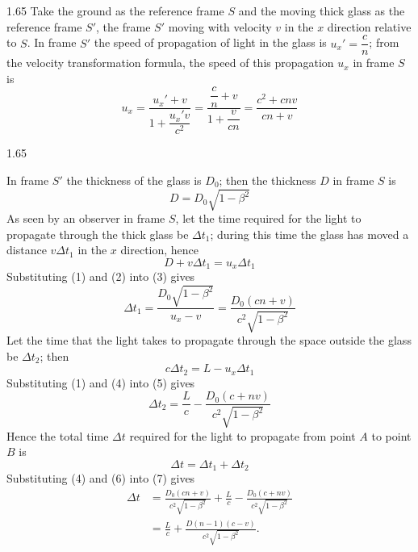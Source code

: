 \begin{solution}{1.65}
Take the ground as the reference frame $S$ and the moving thick glass as the reference frame $S'$, the frame $S'$ moving with velocity $v$ in the $x$ direction relative to $S$. In frame $S'$ the speed of propagation of light in the glass is $u_x'=\dfrac{c}{n}$; from the velocity transformation formula, the speed of this propagation $u_x$ in frame $S$ is
\begin{equation}
u_x=\frac{u_x'+v}{1+\dfrac{u_x'v}{c^2}}=\frac{\dfrac{c}{n}+v}{1+\dfrac{v}{cn}}=\frac{c^2+cnv}{cn+v} \tag{1}
\end{equation}

\begin{figbox}{1.65}
\end{figbox}

In frame $S'$ the thickness of the glass is $D_0$; then the thickness $D$ in frame $S$ is
\begin{equation}
D=D_0\sqrt{1-\beta^2} \tag{2}
\end{equation}
As seen by an observer in frame $S$, let the time required for the light to propagate through the thick glass be $\Delta t_1$; during this time the glass has moved a distance $v\Delta t_1$ in the $x$ direction, hence
\begin{equation}
D+v\Delta t_1=u_x\Delta t_1 \tag{3}
\end{equation}
Substituting (1) and (2) into (3) gives
\begin{equation}
\Delta t_1=\frac{D_0\sqrt{1-\beta^2}}{u_x-v}=\frac{D_0(cn+v)}{c^2\sqrt{1-\beta^2}} \tag{4}
\end{equation}
Let the time that the light takes to propagate through the space outside the glass be $\Delta t_2$; then
\begin{equation}
c\Delta t_2=L-u_x\Delta t_1 \tag{5}
\end{equation}
Substituting (1) and (4) into (5) gives
\begin{equation}
\Delta t_2=\frac{L}{c}-\frac{D_0(c+nv)}{c^2\sqrt{1-\beta^2}} \tag{6}
\end{equation}
Hence the total time $\Delta t$ required for the light to propagate from point $A$ to point $B$ is
\begin{equation}
\Delta t=\Delta t_1+\Delta t_2 \tag{7}
\end{equation}
Substituting (4) and (6) into (7) gives
\[
\begin{aligned}
\Delta t&=\frac{D_0(cn+v)}{c^2\sqrt{1-\beta^2}}+\frac{L}{c}
-\frac{D_0(c+nv)}{c^2\sqrt{1-\beta^2}}\\
&=\frac{L}{c}+\frac{D(n-1)(c-v)}{c^2\sqrt{1-\beta^2}} .
\end{aligned}
\]


\end{solution}
